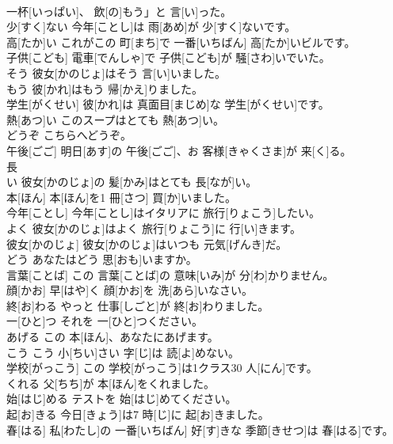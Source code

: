 \documentclass[8pt]{extreport}
\begin{document}
\begin{CJK}{UTF8}{min}
\\	一杯[いっぱい]、 飲[の]もう」と 言[い]った。		
\\	少[すく]ない	今年[ことし]は 雨[あめ]が 少[すく]ないです。		
\\	高[たか]い	これがこの 町[まち]で 一番[いちばん] 高[たか]いビルです。		
\\	子供[こども]	電車[でんしゃ]で 子供[こども]が 騒[さわ]いでいた。		
\\	そう	彼女[かのじょ]はそう 言[い]いました。		
\\	もう	彼[かれ]はもう 帰[かえ]りました。		
\\	学生[がくせい]	彼[かれ]は 真面目[まじめ]な 学生[がくせい]です。		
\\	熱[あつ]い	このスープはとても 熱[あつ]い。		
\\	どうぞ	こちらへどうぞ。		
\\	午後[ごご]	明日[あす]の 午後[ごご]、お 客様[きゃくさま]が 来[く]る。		
\\	長
\\	[なが]い	彼女[かのじょ]の 髪[かみ]はとても 長[なが]い。		
\\	本[ほん]	本[ほん]を1 冊[さつ] 買[か]いました。		
\\	今年[ことし]	今年[ことし]はイタリアに 旅行[りょこう]したい。		
\\	よく	彼女[かのじょ]はよく 旅行[りょこう]に 行[い]きます。		
\\	彼女[かのじょ]	彼女[かのじょ]はいつも 元気[げんき]だ。		
\\	どう	あなたはどう 思[おも]いますか。		
\\	言葉[ことば]	この 言葉[ことば]の 意味[いみ]が 分[わ]かりません。		
\\	顔[かお]	早[はや]く 顔[かお]を 洗[あら]いなさい。		
\\	終[お]わる	やっと 仕事[しごと]が 終[お]わりました。		
\\	一[ひと]つ	それを 一[ひと]つください。		
\\	あげる	この 本[ほん]、あなたにあげます。		
\\	こう	こう 小[ちい]さい 字[じ]は 読[よ]めない。		
\\	学校[がっこう]	この 学校[がっこう]は1クラス30 人[にん]です。		
\\	くれる	父[ちち]が 本[ほん]をくれました。		
\\	始[はじ]める	テストを 始[はじ]めてください。		
\\	起[お]きる	今日[きょう]は7 時[じ]に 起[お]きました。		
\\	春[はる]	私[わたし]の 一番[いちばん] 好[す]きな 季節[きせつ]は 春[はる]です。		

\end{CJK}
\end{document}

